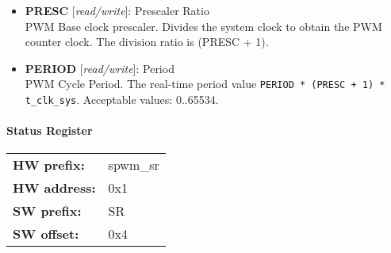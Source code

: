 \vspace{12pt}
\noindent
{}

\begin{itemize}
\item \begin{small}
{\bf 
PRESC
} [\emph{read/write}]: Prescaler Ratio
\\
PWM Base clock prescaler. Divides the system clock to obtain the PWM counter clock. The division ratio is (PRESC + 1).
\end{small}
\item \begin{small}
{\bf 
PERIOD
} [\emph{read/write}]: Period
\\
PWM Cycle Period. The real-time period value \texttt{PERIOD * (PRESC + 1) * t\_clk\_sys}. Acceptable values: 0..65534.
\end{small}
\end{itemize}
\paragraph*{Status Register}\vspace{12pt}

\begin{tabular}{l l }
{\bf HW prefix:}  & spwm\_sr\\
{\bf HW address:}  & 0x1\\
{\bf SW prefix:}  & SR\\
{\bf SW offset:}  & 0x4\\
\end{tabular}


